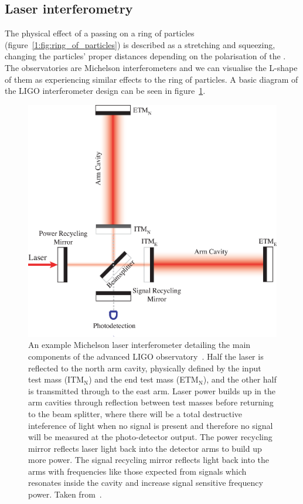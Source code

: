 \subsection{\label{1:sec:laser_interferometry}Laser interferometry}

The physical effect of a passing \gw on a ring of particles (figure~\ref{1:fig:ring_of_particles}) is described as a stretching and squeezing, changing the particles' proper distances depending on the polarisation of the \gw. The \gwadj observatories are Michelson interferometers and we can visualise the L-shape of them as experiencing similar effects to the ring of particles. A basic diagram of the LIGO interferometer design can be seen in figure~\ref{1:fig:ifo}.
%
\begin{figure}
    \centering
    \includegraphics[width=0.9\linewidth]{images/1_general_relativity/gravitational_wave_detection/IFO.eps}
    \caption{An example Michelson laser interferometer detailing the main components of the advanced LIGO \gwadj observatory~\cite{aLIGO:2015}. Half the laser is reflected to the north arm cavity, physically defined by the input test mass (ITM$_{\text{N}}$) and the end test mass (ETM$_{\text{N}}$), and the other half is transmitted through to the east arm. Laser power builds up in the arm cavities through reflection between test masses before returning to the beam splitter, where there will be a total destructive inteference of light when no \gwadj signal is present and therefore no signal will be measured at the photo-detector output. The power recycling mirror reflects laser light back into the detector arms to build up more power. The signal recycling mirror reflects light back into the arms with frequencies like those expected from \gwadj signals which resonates inside the cavity and increase signal sensitive frequency power. Taken from~\cite{IFO_diagram:2008}.}
    \label{1:fig:ifo}
\end{figure}
%

